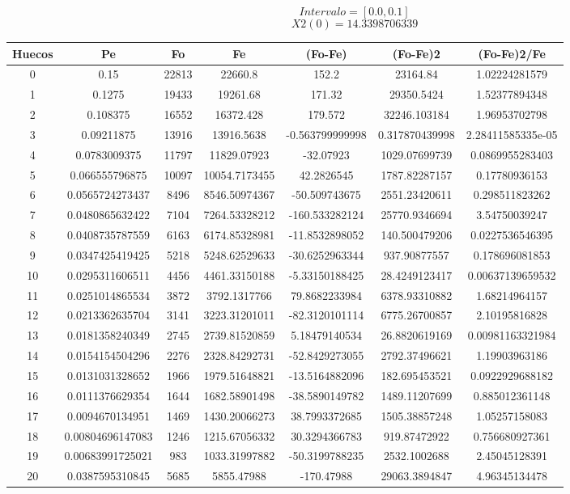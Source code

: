 \documentclass{article}
\begin{document}
$$
Intervalo = [0.0, 0.1]
$$
$$
X2(0) = 14.3398706339
$$
\begin{tabular}{|c|c|c|c|c|c|c|}
Huecos&Pe&Fo&Fe&(Fo{-}Fe)&(Fo{-}Fe)2&(Fo{-}Fe)2/Fe\\
\hline
0&0.15&22813&22660.8&152.2&23164.84&1.02224281579\\
\hline
1&0.1275&19433&19261.68&171.32&29350.5424&1.52377894348\\
\hline
2&0.108375&16552&16372.428&179.572&32246.103184&1.96953702798\\
\hline
3&0.09211875&13916&13916.5638&{-}0.563799999998&0.317870439998&2.28411585335e{-}05\\
\hline
4&0.0783009375&11797&11829.07923&{-}32.07923&1029.07699739&0.0869955283403\\
\hline
5&0.066555796875&10097&10054.7173455&42.2826545&1787.82287157&0.17780936153\\
\hline
6&0.0565724273437&8496&8546.50974367&{-}50.509743675&2551.23420611&0.298511823262\\
\hline
7&0.0480865632422&7104&7264.53328212&{-}160.533282124&25770.9346694&3.54750039247\\
\hline
8&0.0408735787559&6163&6174.85328981&{-}11.8532898052&140.500479206&0.0227536546395\\
\hline
9&0.0347425419425&5218&5248.62529633&{-}30.6252963344&937.90877557&0.178696081853\\
\hline
10&0.0295311606511&4456&4461.33150188&{-}5.33150188425&28.4249123417&0.00637139659532\\
\hline
11&0.0251014865534&3872&3792.1317766&79.8682233984&6378.93310882&1.68214964157\\
\hline
12&0.0213362635704&3141&3223.31201011&{-}82.3120101114&6775.26700857&2.10195816828\\
\hline
13&0.0181358240349&2745&2739.81520859&5.18479140534&26.8820619169&0.00981163321984\\
\hline
14&0.0154154504296&2276&2328.84292731&{-}52.8429273055&2792.37496621&1.19903963186\\
\hline
15&0.0131031328652&1966&1979.51648821&{-}13.5164882096&182.695453521&0.0922929688182\\
\hline
16&0.0111376629354&1644&1682.58901498&{-}38.5890149782&1489.11207699&0.885012361148\\
\hline
17&0.0094670134951&1469&1430.20066273&38.7993372685&1505.38857248&1.05257158083\\
\hline
18&0.00804696147083&1246&1215.67056332&30.3294366783&919.87472922&0.756680927361\\
\hline
19&0.00683991725021&983&1033.31997882&{-}50.3199788235&2532.1002688&2.45045128391\\
\hline
20&0.0387595310845&5685&5855.47988&{-}170.47988&29063.3894847&4.96345134478\\
\end{tabular}
\end{document}
